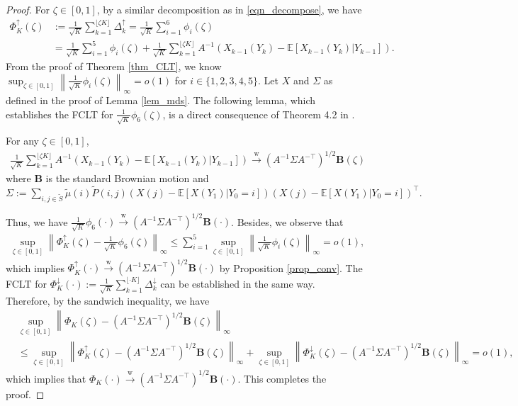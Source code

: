 \documentclass{opt2025} %
\begin{document}
\begin{proof}
For $\zeta\in [0,1]$, by a similar decomposition as in \cref{eqn_decompose}, we have
\begin{align*}
\Phi_{K}^{\uparrow}(\zeta) &:=  \frac{1}{\sqrt{K}}\sum_{k=1}^{\lfloor \zeta K \rfloor}\Delta^{\uparrow}_{k} =  \frac{1}{\sqrt{K}} \sum_{i=1}^6 \phi_i(\zeta)\\
&= \frac{1}{\sqrt{K}} \sum_{i=1}^5 \phi_i(\zeta) +  \frac{1}{\sqrt{K}}\sum_{k=1}^{\lfloor \zeta K \rfloor} A^{-1}(X_{k-1}(Y_{k}) - \mathbb{E}[X_{k-1}(Y_{k})| Y_{k-1}]).
\end{align*}
From the proof of Theorem \ref{thm_CLT}, we know $\sup_{\zeta\in [0,1]}\left\| \frac{1}{\sqrt{K}}\phi_i(\zeta)\right\|_{\infty} = o(1)$ for $i \in \{1,2,3,4,5\}$. Let $X$ and $\Sigma$ as defined in the proof of Lemma \ref{lem_mds}. The following lemma, which establishes the FCLT for $\frac{1}{\sqrt{K}}\phi_6(\zeta)$, is a direct consequence of Theorem 4.2 in \citet{hall2014martingale}.
\begin{lemma}
For any $\zeta\in [0,1]$,
\begin{align*}
\frac{1}{\sqrt{K}}\sum_{k=1}^{\lfloor \zeta K \rfloor} A^{-1}(X_{k-1}(Y_{k}) - \mathbb{E}[X_{k-1}(Y_{k})| Y_{k-1}]) \overset{\mathrm{w}}{\rightarrow} (A^{-1}\Sigma A^{-\top})^{1/2}\textbf{B}(\zeta)
\end{align*}
where $\textbf{B}$ is the standard Brownian motion and 
$\Sigma := \sum_{i,j\in \tilde{S}} \tilde{\mu}(i)  \tilde{P}(i,j) (X(j) - \mathbb{E}[X(Y_1)|Y_0=i])(X(j) - \mathbb{E}[X(Y_1)|Y_0=i])^{\top}.$
\end{lemma}
Thus, we have $\frac{1}{\sqrt{K}}\phi_6(\cdot) \overset{\mathrm{w}}{\rightarrow} (A^{-1}\Sigma A^{-\top})^{1/2}\textbf{B}(\cdot)$. Besides, we observe that
\begin{align*}
\sup_{\zeta \in [0,1]}\left\|\Phi_{K}^{\uparrow}(\zeta) - \frac{1}{\sqrt{K}}\phi_6 (\zeta)\right\|_{\infty} \leq \sum_{i=1}^5 \sup_{\zeta \in [0,1]}\left\| \frac{1}{\sqrt{K}}\phi_i(\zeta)\right\|_{\infty} = o(1),
\end{align*}
which implies $\Phi_{K}^{\uparrow}(\cdot) \overset{\mathrm{w}}{\rightarrow} (A^{-1}\Sigma A^{-\top})^{1/2}\textbf{B}(\cdot)$ by Proposition \ref{prop_conv}. The FCLT for $\Phi_{K}^{\downarrow}(\cdot) := \frac{1}{\sqrt{K}}\sum_{k=1}^{\lfloor \cdot K \rfloor} \Delta_k^{\downarrow}$ can be established in the same way. Therefore, by the sandwich inequality, we have
\begin{align*}
&\sup_{\zeta \in [0,1]}\left\|\Phi_{K}(\zeta) - (A^{-1}\Sigma A^{-\top})^{1/2}\textbf{B}(\zeta)\right\|_{\infty} \\
&\leq \sup_{\zeta \in [0,1]}\left\|\Phi_{K}^{\uparrow}(\zeta) - (A^{-1}\Sigma A^{-\top})^{1/2}\textbf{B}(\zeta)\right\|_{\infty}  + \sup_{\zeta \in [0,1]}\left\|\Phi_{K}^{\downarrow}(\zeta) - (A^{-1}\Sigma A^{-\top})^{1/2}\textbf{B}(\zeta)\right\|_{\infty}  = o(1),
\end{align*}
which implies that $\Phi_{K}(\cdot) \overset{\mathrm{w}}{\rightarrow} (A^{-1}\Sigma A^{-\top})^{1/2}\textbf{B}(\cdot)$. This completes the proof.
    
\end{proof}
\end{document}
